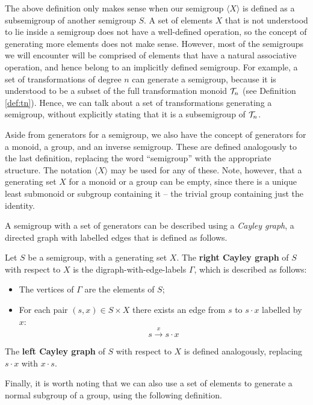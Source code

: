 The above definition only makes sense when our semigroup $\langle X \rangle$ is
defined as a subsemigroup of another semigroup $S$.  A set of elements $X$ that
is not understood to lie inside a semigroup does not have a well-defined
operation, so the concept of generating more elements does not make sense.
However, most of the semigroups we will encounter will be comprised of elements
that have a natural associative operation, and hence belong to an implicitly
defined semigroup.  For example, a set of transformations of degree $n$ can
generate a semigroup, because it is understood to be a subset of the full
transformation monoid $\mathcal{T}_n$ (see Definition \ref{def:tn}).  Hence, we can
talk about a set of transformations generating a semigroup, without explicitly
stating that it is a subsemigroup of $\mathcal{T}_n$.

Aside from generators for a semigroup, we also have the concept of generators
for a monoid, a group, and an inverse semigroup.  These are defined analogously
to the last definition, replacing the word ``semigroup'' with the appropriate
structure.  The notation $\langle X \rangle$ may be used for any of these.
Note, however, that a generating set $X$ for a monoid or a group can be empty,
since there is a unique least submonoid or subgroup containing it -- the
trivial group containing just the identity.

A semigroup with a set of generators can be described using a \textit{Cayley
  graph}, a directed graph with labelled edges that is defined as follows.

\begin{definition}
  \label{def:cayley-graph}
  Let $S$ be a semigroup, with a generating set $X$.  The \textbf{right Cayley
    graph} of $S$ with respect to $X$ is the digraph-with-edge-labels $\Gamma$,
  which is described as follows:
  \begin{itemize}
  \item The vertices of $\Gamma$ are the elements of $S$;
  \item For each pair $(s, x) \in S \times X$ there exists an edge from $s$ to
    $s \cdot x$ labelled by $x$:
    $$s \overset{x}{\longrightarrow} s \cdot x$$
  \end{itemize}
  The \textbf{left Cayley graph} of $S$ with respect to $X$ is defined
  analogously, replacing $s \cdot x$ with $x \cdot s$.
\end{definition}

Finally, it is worth noting that we can also use a set of elements to generate a
normal subgroup of a group, using the following definition.

